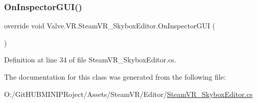 \subsubsection{\texorpdfstring{OnInspectorGUI()}{OnInspectorGUI()}}
{\footnotesize\ttfamily override void Valve.\+V\+R.\+Steam\+V\+R\+\_\+\+Skybox\+Editor.\+On\+Inspector\+G\+UI (\begin{DoxyParamCaption}{ }\end{DoxyParamCaption})}



Definition at line 34 of file Steam\+V\+R\+\_\+\+Skybox\+Editor.\+cs.



The documentation for this class was generated from the following file\+:\begin{DoxyCompactItemize}
\item 
O\+:/\+Git\+H\+U\+B\+M\+I\+N\+I\+P\+Roject/\+Assets/\+Steam\+V\+R/\+Editor/\mbox{\hyperlink{_steam_v_r___skybox_editor_8cs}{Steam\+V\+R\+\_\+\+Skybox\+Editor.\+cs}}\end{DoxyCompactItemize}
